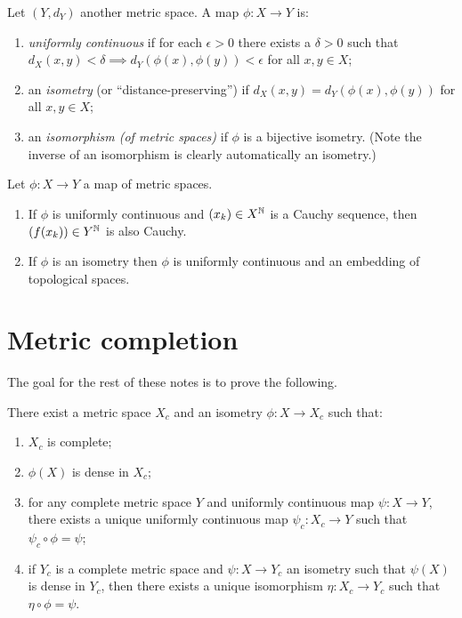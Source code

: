 \begin{definition}
  Let $(Y, d_Y)$ another metric space. A map $\phi : X \to Y$ is:
  \begin{enumerate}
  \item \textit{uniformly continuous} if for each $\epsilon > 0$ there
    exists a $\delta > 0$ such that $d_X(x,y) < \delta \implies
    d_Y(\phi(x),\phi(y)) < \epsilon$ for all $x,y \in X$;
  \item an \textit{isometry} (or ``distance-preserving'') if $d_X(x,y)
    = d_Y(\phi(x),\phi(y))$ for all $x,y \in X$;
  \item an \textit{isomorphism (of metric spaces)} if $\phi$ is a
    bijective isometry. (Note the inverse of an isomorphism is clearly
    automatically an isometry.)
  \end{enumerate}
\end{definition}

\begin{exercise}
  \label{maps}
  Let $\phi : X \to Y$ a map of metric spaces.
  \begin{enumerate}
  \item If $\phi$ is uniformly continuous and $(x_k) \in X^{\mathbb{N}}$ is a
    Cauchy sequence, then $(f(x_k)) \in Y^{\mathbb{N}}$ is also Cauchy.
  \item If $\phi$ is an isometry then $\phi$ is uniformly continuous
    and an embedding of topological spaces.
  \end{enumerate}
\end{exercise}


\section{Metric completion}

The goal for the rest of these notes is to prove the following.

\begin{proposition}
  \label{completion}
  There exist a metric space $X_c$ and an isometry $\phi : X \to X_c$
  such that:
  \begin{enumerate}
  \item $X_c$ is complete;
  \item $\phi(X)$ is dense in $X_c$;
  \item for any complete metric space $Y$ and uniformly continuous map
    $\psi : X \to Y$, there exists a unique uniformly continuous map
    $\psi_c : X_c \to Y$ such that $\psi_c \circ \phi = \psi$;
  \item if $Y_c$ is a complete metric space and $\psi : X \to Y_c$ an
    isometry such that $\psi(X)$ is dense in $Y_c$, then there exists
    a unique isomorphism $\eta : X_c \to Y_c$ such that $\eta \circ
    \phi = \psi$.
  \end{enumerate}
\end{proposition}

